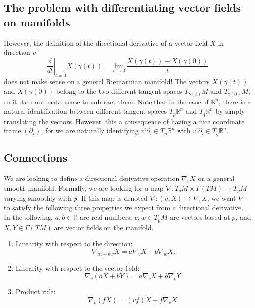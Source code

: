 \documentclass[
]{article}
\providecommand{\tightlist}{%
  \setlength{\itemsep}{0pt}\setlength{\parskip}{0pt}}
\begin{document}
\hypertarget{the-problem-with-differentiating-vector-fields-on-manifolds}{%
\subsection{The problem with differentiating vector fields on
manifolds}\label{the-problem-with-differentiating-vector-fields-on-manifolds}}

However, the definition of the directional derivative of a vector field
\(X\) in direction \(v\) \[
    \left.\frac{d }{d t}\right|_{t=0} X(\gamma(t)) = \lim_{t \to 0}\frac{X(\gamma(t)) - X(\gamma(0))}{t}
\] does not make sense on a general Riemannian manifold! The vectors
\(X(\gamma(t))\) and \(X(\gamma(0))\) belong to the two different
tangent spaces \(T_{\gamma(t)}M\) and \(T_{\gamma(0)}M\), so it does not
make sense to subtract them. Note that in the case of \(\mathbb{R}^n\),
there is a natural identification between different tangent spaces
\(T_p\mathbb{R}^n\) and \(T_q\mathbb{R}^n\) by simply translating the
vectors. However, this a consequence of having a nice coordinate frame
\((\partial_i)\), for we are naturally identifying
\(v^i\partial_i \in T_p\mathbb{R}^n\) with
\(v^i\partial_i \in T_q\mathbb{R}^n\).

\hypertarget{connections}{%
\subsection{Connections}\label{connections}}

We are looking to define a directional derivative operation
\(\nabla_v X\) on a general smooth manifold. Formally, we are looking
for a map \(\nabla: T_pM \times \Gamma(TM) \to T_pM\) varying smoothly
with \(p\). If this map is denoted \(\nabla: (v, X) \mapsto \nabla_vX\),
we want \(\nabla\) to satisfy the following three properties we expect
from a directional derivative. In the following, \(a,b \in \mathbb{R}\)
are real numbers, \(v,w \in T_pM\) are vectors based at \(p\), and
\(X,Y \in \Gamma(TM)\) are vector fields on the manifold.

\begin{enumerate}
\def\labelenumi{\arabic{enumi}.}
\tightlist
\item
  Linearity with respect to the direction: \[
   \nabla_{av + bw}X = a\nabla_vX + b\nabla_wX.
  \]
\item
  Linearity with respect to the vector field: \[
   \nabla_v(aX + bY) = a\nabla_vX + b\nabla_vY.
  \]
\item
  Product rule: \[
   \nabla_v(fX) = (vf)X + f\nabla_vX.
  \]
\end{enumerate}
\end{document}
